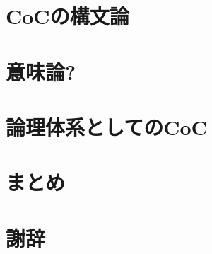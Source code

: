 \documentclass{ltjsarticle}
\begin{document}

\section{CoCの構文論}

\section{意味論?}

\section{論理体系としてのCoC}

\section{まとめ}

\section{謝辞}



\end{document}
